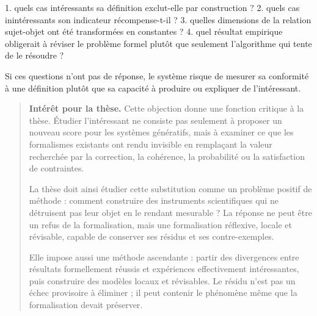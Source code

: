 \documentclass[10pt,a4paper]{article}
\begin{document}
1. quels cas intéressants sa définition exclut-elle par construction ? 2. quels cas inintéressants son indicateur récompense-t-il ? 3. quelles dimensions de la relation sujet-objet ont été transformées en constantes ? 4. quel résultat empirique obligerait à réviser le problème formel plutôt que seulement    l'algorithme qui tente de le résoudre ?

Si ces questions n'ont pas de réponse, le système risque de mesurer sa conformité à une définition plutôt que sa capacité à produire ou expliquer de l'intéressant.

\begin{quote}
\textbf{Intérêt pour la thèse.} Cette objection donne une fonction critique à la thèse. Étudier l'intéressant ne consiste pas seulement à proposer un nouveau score pour les systèmes génératifs, mais à examiner ce que les formalismes existants ont rendu invisible en remplaçant la valeur recherchée par la correction, la cohérence, la probabilité ou la satisfaction de contraintes.

La thèse doit ainsi étudier cette substitution comme un problème positif de méthode : comment construire des instruments scientifiques qui ne détruisent pas leur objet en le rendant mesurable ? La réponse ne peut être un refus de la formalisation, mais une formalisation réflexive, locale et révisable, capable de conserver ses résidus et ses contre-exemples.

Elle impose aussi une méthode ascendante : partir des divergences entre résultats formellement réussis et expériences effectivement intéressantes, puis construire des modèles locaux et révisables. Le résidu n'est pas un échec provisoire à éliminer ; il peut contenir le phénomène même que la formalisation devait préserver.
\end{quote}
\end{document}
